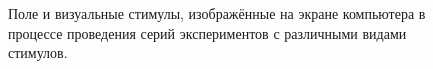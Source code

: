 \documentclass[12pt,a4paper,oneside,fleqn,leqno]{article}
\begin{document}
\begin{figure}[h!]
\begin{minipage}[h!]{0.49\linewidth}
\end{minipage}
\hfill
\begin{minipage}[h!]{0.49\linewidth}
\end{minipage}
\caption{Поле и визуальные стимулы, изображённые на экране компьютера в процессе проведения серий экспериментов с различными видами стимулов.}
\label{field}
\end{figure}
\end{document}
